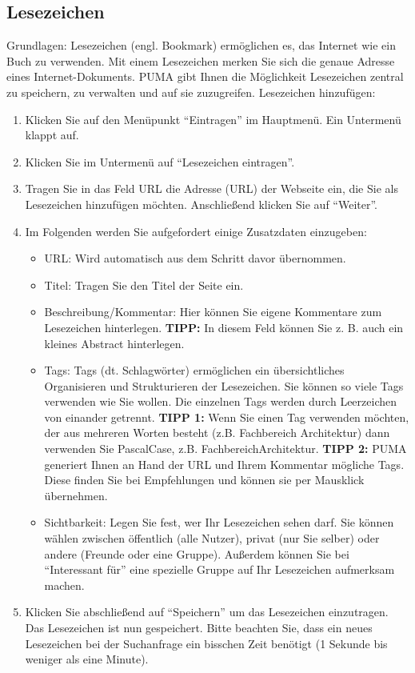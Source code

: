 \documentclass[a4paper,11pt,twoside]{scrbook}
\begin{document}
\subsection{Lesezeichen} %
Grundlagen:
\newline
Lesezeichen (engl. Bookmark) ermöglichen es, das Internet wie ein Buch zu verwenden. Mit einem Lesezeichen merken Sie sich die genaue Adresse eines Internet-Dokuments. PUMA gibt Ihnen die Möglichkeit Lesezeichen zentral zu speichern, zu verwalten und auf sie zuzugreifen. 
\newline
\newline
Lesezeichen hinzufügen:
\begin{enumerate}
    \item Klicken Sie auf den Menüpunkt \enquote{Eintragen} im Hauptmenü. Ein Untermenü klappt auf.
    \item Klicken Sie im Untermenü auf \enquote{Lesezeichen eintragen}.
    \item Tragen Sie in das Feld URL die Adresse (URL) der Webseite ein, die Sie als Lesezeichen hinzufügen möchten. Anschließend klicken Sie auf \enquote{Weiter}. 
    \item Im Folgenden werden Sie aufgefordert einige Zusatzdaten einzugeben:
    \begin{itemize}
        \item URL: Wird automatisch aus dem Schritt davor übernommen.
        \item Titel: Tragen Sie den Titel der Seite ein. %
        \item Beschreibung/Kommentar: Hier können Sie eigene Kommentare zum Lesezeichen hinterlegen. \textbf{TIPP:} In diesem Feld können Sie z. B. auch ein kleines Abstract hinterlegen. 
        \item Tags: Tags (dt. Schlagwörter) ermöglichen ein übersichtliches Organisieren und Strukturieren der Lesezeichen. Sie können so viele Tags verwenden wie Sie wollen. Die einzelnen Tags werden durch Leerzeichen von einander getrennt. \newline \textbf{TIPP 1:} Wenn Sie einen Tag verwenden möchten, der aus mehreren Worten besteht (z.B. Fachbereich Architektur) dann verwenden Sie PascalCase, z.B. FachbereichArchitektur. \newline \textbf{TIPP 2:} PUMA generiert Ihnen an Hand der URL und Ihrem Kommentar  mögliche Tags. Diese finden Sie bei Empfehlungen und können sie per Mausklick übernehmen.
        \item Sichtbarkeit: Legen Sie fest, wer Ihr Lesezeichen sehen darf. Sie können wählen zwischen öffentlich (alle Nutzer), privat (nur Sie selber) oder andere (Freunde oder eine Gruppe). Außerdem können Sie bei \enquote{Interessant für} eine spezielle Gruppe auf Ihr Lesezeichen aufmerksam machen.  
    \end{itemize}
    \item Klicken Sie abschließend auf \enquote{Speichern} um das Lesezeichen einzutragen. Das Lesezeichen ist nun gespeichert. Bitte beachten Sie, dass ein neues Lesezeichen bei der Suchanfrage ein bisschen Zeit benötigt (1 Sekunde bis weniger als eine Minute). 
\end{enumerate}
\end{document}
